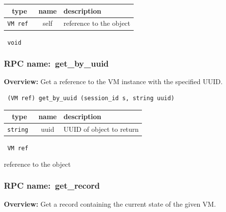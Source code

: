  
\vspace{0.3cm}
\begin{tabular}{|c|c|p{7cm}|}
 \hline
{\bf type} & {\bf name} & {\bf description} \\ \hline
{\tt VM ref } & self & reference to the object \\ \hline 

\end{tabular}

\vspace{0.3cm}

{\tt 
void
}



\vspace{0.3cm}
\vspace{0.3cm}
\vspace{0.3cm}
\subsubsection{RPC name:~get\_by\_uuid}

{\bf Overview:} 
Get a reference to the VM instance with the specified UUID.

\begin{verbatim} (VM ref) get_by_uuid (session_id s, string uuid)\end{verbatim}



 
\vspace{0.3cm}
\begin{tabular}{|c|c|p{7cm}|}
 \hline
{\bf type} & {\bf name} & {\bf description} \\ \hline
{\tt string } & uuid & UUID of object to return \\ \hline 

\end{tabular}

\vspace{0.3cm}

{\tt 
VM ref
}


reference to the object
\vspace{0.3cm}
\vspace{0.3cm}
\vspace{0.3cm}
\subsubsection{RPC name:~get\_record}

{\bf Overview:} 
Get a record containing the current state of the given VM.

